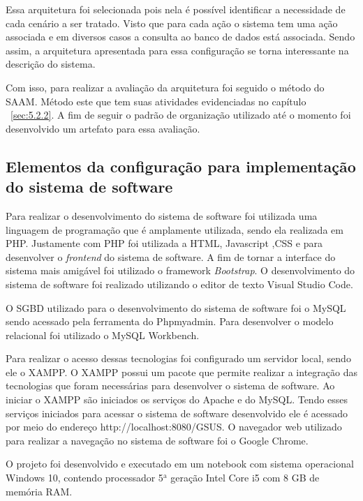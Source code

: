 Essa arquitetura foi selecionada pois nela é possível identificar a necessidade de cada cenário a ser tratado. Visto que para cada ação o sistema tem uma ação associada e em diversos casos a consulta ao banco de dados está associada. Sendo assim, a arquitetura apresentada para essa configuração se torna interessante na descrição do sistema. 

Com isso, para realizar a avaliação da arquitetura foi seguido o método do \acrfull{SAAM}. Método este que tem suas atividades evidenciadas no capítulo ~\ref{sec:5.2.2}. A fim de seguir o padrão de organização utilizado até o momento foi desenvolvido um artefato para essa avaliação.

\subsection{Elementos da configuração para implementação do sistema de software}

Para realizar o desenvolvimento do sistema de software foi utilizada uma linguagem de programação que é amplamente utilizada, sendo ela realizada em PHP. Justamente com PHP foi utilizada a \acrfull{HTML}, Javascript ,\acrfull{CSS} e para desenvolver o \emph{frontend} do sistema de software. A fim de tornar a interface do sistema mais amigável foi utilizado o framework \emph{Bootstrap}. O desenvolvimento do sistema de software foi realizado utilizando o editor de texto Visual Studio Code.

O \acrfull{SGBD} utilizado para o desenvolvimento do sistema de software foi o MySQL sendo acessado pela ferramenta do Phpmyadmin. Para desenvolver o modelo relacional foi utilizado o MySQL Workbench. 

Para realizar o acesso dessas tecnologias foi configurado um servidor local, sendo ele o XAMPP. O XAMPP possui um pacote que permite realizar a integração das tecnologias que foram necessárias para desenvolver o sistema de software.
Ao iniciar o XAMPP são iniciados os serviços do Apache e do MySQL. Tendo esses serviços iniciados para acessar o sistema de software desenvolvido ele é acessado por meio do endereço http://localhost:8080/GSUS. O navegador web utilizado para realizar a navegação no sistema de software foi o Google Chrome.

O projeto foi desenvolvido e executado em um notebook com sistema operacional Windows 10, contendo processador \newcommand{\azinho}{$^{\mathrm a}$} 5$^{\mathrm a}$ geração Intel Core i5 com 8 GB de memória RAM.

